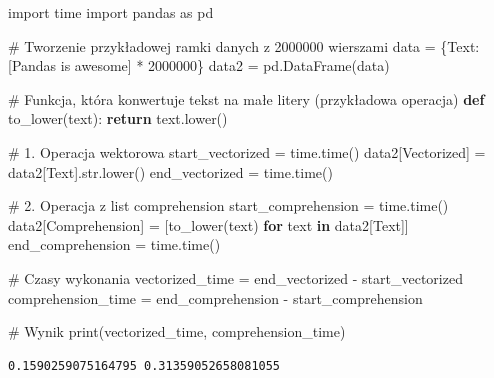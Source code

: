 \documentclass[
  polish,
  letterpaper,
  DIV=11,
  numbers=noendperiod]{scrreprt}
\newenvironment{Shaded}{\begin{snugshade}}{\end{snugshade}}
\newcommand{\BuiltInTok}[1]{\textcolor[rgb]{0.00,0.23,0.31}{#1}}
\newcommand{\CommentTok}[1]{\textcolor[rgb]{0.37,0.37,0.37}{#1}}
\newcommand{\ControlFlowTok}[1]{\textcolor[rgb]{0.00,0.23,0.31}{\textbf{#1}}}
\newcommand{\DecValTok}[1]{\textcolor[rgb]{0.68,0.00,0.00}{#1}}
\newcommand{\ImportTok}[1]{\textcolor[rgb]{0.00,0.46,0.62}{#1}}
\newcommand{\KeywordTok}[1]{\textcolor[rgb]{0.00,0.23,0.31}{\textbf{#1}}}
\newcommand{\NormalTok}[1]{\textcolor[rgb]{0.00,0.23,0.31}{#1}}
\newcommand{\OperatorTok}[1]{\textcolor[rgb]{0.37,0.37,0.37}{#1}}
\newcommand{\StringTok}[1]{\textcolor[rgb]{0.13,0.47,0.30}{#1}}
\begin{document}
\begin{Shaded}
\begin{Highlighting}[]
\ImportTok{import}\NormalTok{ time}
\ImportTok{import}\NormalTok{ pandas }\ImportTok{as}\NormalTok{ pd}

\CommentTok{\# Tworzenie przykładowej ramki danych z 2000000 wierszami}
\NormalTok{data }\OperatorTok{=}\NormalTok{ \{}\StringTok{\textquotesingle{}Text\textquotesingle{}}\NormalTok{: [}\StringTok{\textquotesingle{}Pandas is awesome\textquotesingle{}}\NormalTok{] }\OperatorTok{*} \DecValTok{2000000}\NormalTok{\}}
\NormalTok{data2 }\OperatorTok{=}\NormalTok{ pd.DataFrame(data)}


\CommentTok{\# Funkcja, która konwertuje tekst na małe litery (przykładowa operacja)}
\KeywordTok{def}\NormalTok{ to\_lower(text):}
    \ControlFlowTok{return}\NormalTok{ text.lower()}


\CommentTok{\# 1. Operacja wektorowa}
\NormalTok{start\_vectorized }\OperatorTok{=}\NormalTok{ time.time()}
\NormalTok{data2[}\StringTok{\textquotesingle{}Vectorized\textquotesingle{}}\NormalTok{] }\OperatorTok{=}\NormalTok{ data2[}\StringTok{\textquotesingle{}Text\textquotesingle{}}\NormalTok{].}\BuiltInTok{str}\NormalTok{.lower()}
\NormalTok{end\_vectorized }\OperatorTok{=}\NormalTok{ time.time()}

\CommentTok{\# 2. Operacja z list comprehension}
\NormalTok{start\_comprehension }\OperatorTok{=}\NormalTok{ time.time()}
\NormalTok{data2[}\StringTok{\textquotesingle{}Comprehension\textquotesingle{}}\NormalTok{] }\OperatorTok{=}\NormalTok{ [to\_lower(text) }\ControlFlowTok{for}\NormalTok{ text }\KeywordTok{in}\NormalTok{ data2[}\StringTok{\textquotesingle{}Text\textquotesingle{}}\NormalTok{]]}
\NormalTok{end\_comprehension }\OperatorTok{=}\NormalTok{ time.time()}

\CommentTok{\# Czasy wykonania}
\NormalTok{vectorized\_time }\OperatorTok{=}\NormalTok{ end\_vectorized }\OperatorTok{{-}}\NormalTok{ start\_vectorized}
\NormalTok{comprehension\_time }\OperatorTok{=}\NormalTok{ end\_comprehension }\OperatorTok{{-}}\NormalTok{ start\_comprehension}

\CommentTok{\# Wynik}
\BuiltInTok{print}\NormalTok{(vectorized\_time, comprehension\_time)}
\end{Highlighting}
\end{Shaded}

\begin{verbatim}
0.1590259075164795 0.31359052658081055
\end{verbatim}
\end{document}
